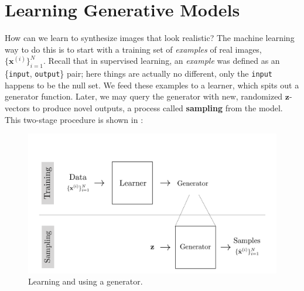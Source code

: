\section{Learning Generative Models}
How can we learn to synthesize images that look realistic? The machine learning way to do this is to start with a training set of \textit{examples} of real images, $\{\mathbf{x}^{(i)}\}_{i=1}^N$. Recall that in supervised learning, an \textit{example} was defined as an \{\texttt{input}, \texttt{output}\} pair; here things are actually no different, only the \texttt{input} happens to be the null set. We feed these examples to a learner, which spits out a generator function. Later, we may query the generator with new, randomized $\mathbf{z}$-vectors to produce novel outputs, a process called \textbf{sampling} from the model. This two-stage procedure is shown in \fig{\ref{fig:generative_models:gen_model_training_vs_sampling}}:
\begin{figure}[h]
    \centerline{
    \includegraphics[width=0.9\linewidth]{./figures/generative_models/gen_model_training_vs_sampling.pdf}
    }
    \caption{Learning and using a generator.}
    \label{fig:generative_models:gen_model_training_vs_sampling}
\end{figure}

